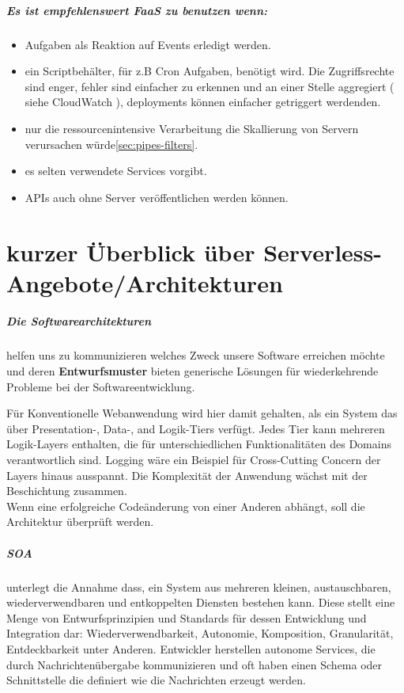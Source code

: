 \documentclass[
12pt,
english,
ngerman,
headsepline,
twoside,
openright,
numbers=noenddot,version=first
]{scrreprt}
\begin{document}
\paragraph{Es ist empfehlenswert \acrshort{FaaS} zu benutzen wenn:}
\begin{itemize}
	\item Aufgaben als Reaktion auf Events erledigt werden. 
	\item ein Scriptbehälter, für z.B Cron Aufgaben, benötigt wird. Die Zugriffsrechte sind enger, fehler sind einfacher zu erkennen und an einer Stelle aggregiert ( siehe CloudWatch ), deployments können einfacher getriggert werdenden.
	\item nur die ressourcenintensive Verarbeitung die Skallierung von Servern verursachen würde\ref{sec:pipes-filters}.
	\item es selten verwendete Services vorgibt.
	\item \acrshort{API}s auch ohne Server veröffentlichen werden können.
\end{itemize}\cite{lambdaAWS}
\chapter{kurzer Überblick über Serverless-Angebote/Architekturen}

\paragraph{Die Softwarearchitekturen} helfen uns zu kommunizieren welches Zweck unsere Software erreichen möchte und deren \textbf{Entwurfsmuster} bieten generische Lösungen für wiederkehrende Probleme bei der Softwareentwicklung.

Für Konventionelle Webanwendung wird hier damit gehalten, als ein System das über Presentation-, Data-, and Logik-Tiers verfügt. Jedes Tier kann mehreren Logik-Layers enthalten, die für unterschiedlichen Funktionalitäten des Domains verantwortlich sind. Logging wäre ein Beispiel für Cross-Cutting Concern der Layers hinaus ausspannt. Die Komplexität der Anwendung wächst mit der Beschichtung zusammen.\\


Wenn eine erfolgreiche Codeänderung von einer Anderen abhängt, soll die Architektur überprüft werden.


\paragraph{\acrfull{SOA}}
\label{sec:soa} unterlegt die Annahme dass, ein System aus mehreren kleinen, austauschbaren, wiederverwendbaren und entkoppelten Diensten bestehen kann. Diese stellt eine Menge von Entwurfsprinzipien und Standards für dessen Entwicklung und Integration\cite{cloudEssentials} dar: Wiederverwendbarkeit, Autonomie, Komposition, Granularität, Entdeckbarkeit unter Anderen. Entwickler herstellen autonome Services, die durch Nachrichtenübergabe kommunizieren und oft haben einen Schema oder Schnittstelle die definiert wie die Nachrichten erzeugt werden.
\end{document}
